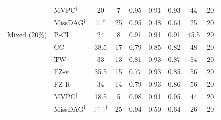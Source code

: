 \begin{tabular}{llccccccc}
                     & MVPC$^\ddagger$    & 20 & 7 & 0.95 & 0.91 & 0.93 & 44 & 20 \\
                     & MissDAG$^\dagger$  & \textcolor{lightgray}{27}$^\dagger$ & 25 & 0.95 & 0.48 & 0.64 & 25 & 20 \\
    \midrule
    Mixed (20\%)     & P-CI               & 24 & 8 & 0.91 & 0.91 & 0.91 & 45.5 & 20 \\
                     & CC                 & 38.5 & 17 & 0.79 & 0.85 & 0.82 & 48 & 20 \\
                     & TW                 & 33 & 13 & 0.81 & 0.93 & 0.87 & 54 & 20 \\
                     & FZ-v               & 35.5 & 15 & 0.77 & 0.93 & 0.85 & 56 & 20 \\
                     & FZ-R               & 34 & 14 & 0.79 & 0.93 & 0.86 & 56 & 20 \\
                     & MVPC$^\ddagger$    & 18.5 & 5 & 0.98 & 0.91 & 0.95 & 44 & 20 \\
                     & MissDAG$^\dagger$  & \textcolor{lightgray}{27.5}$^\dagger$ & 25 & 0.94 & 0.50 & 0.64 & 26 & 20 \\
    \bottomrule
\end{tabular}
